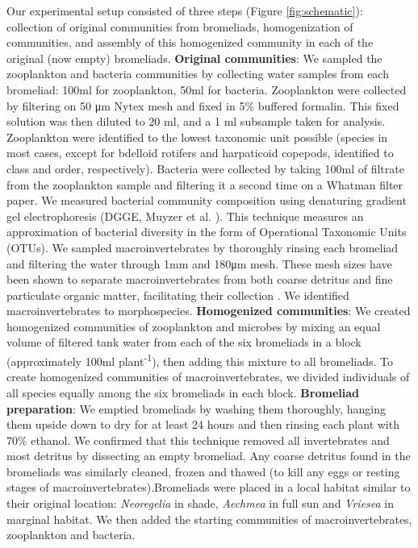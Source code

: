Our experimental setup consisted of three steps (Figure \ref{fig:schematic}): collection
of original communities from bromeliads, homogenization of communities,
and assembly of this homogenized community in each of the original (now
empty) bromeliads. \textbf{Original communities}: We sampled the
zooplankton and bacteria communities by collecting water samples from
each bromeliad: 100ml for zooplankton, 50ml for bacteria. Zooplankton
were collected by filtering on 50 μm Nytex mesh and fixed in 5\%
buffered formalin. This fixed solution was then diluted to 20 ml, and a
1 ml subsample taken for analysis. Zooplankton were identified to the
lowest taxonomic unit possible (species in most cases, except for
bdelloid rotifers and harpaticoid copepods, identified to class and
order, respectively). Bacteria were collected by taking 100ml of
filtrate from the zooplankton sample and filtering it a second time on a
Whatman filter paper. We measured bacterial community composition using
denaturing gradient gel electrophoresis (DGGE, Muyzer et al.
\citeyearpar{Muyzer1993}). This technique measures an approximation of
bacterial diversity in the form of Operational Taxonomic Units (OTUs).
We sampled macroinvertebrates by thoroughly rinsing each bromeliad and
filtering the water through 1mm and 180μm mesh. These mesh sizes have
been shown to separate macroinvertebrates from both coarse detritus and
fine particulate organic matter, facilitating their collection
\citep{Romero2010}. We identified macroinvertebrates to morphospecies.
\textbf{Homogenized communities}: We created homogenized communities of
zooplankton and microbes by mixing an equal volume of filtered tank
water from each of the six bromeliads in a block (approximately 100ml
plant\textsuperscript{-1}), then adding this mixture to all bromeliads.
To create homogenized communities of macroinvertebrates, we divided
individuals of all species equally among the six bromeliads in each
block. \textbf{Bromeliad preparation}: We emptied bromeliads by washing
them thoroughly, hanging them upside down to dry for at least 24 hours
and then rinsing each plant with 70\% ethanol. We confirmed that this
technique removed all invertebrates and most detritus by dissecting an
empty bromeliad. Any coarse detritus found in the bromeliads was
similarly cleaned, frozen and thawed (to kill any eggs or resting stages
of macroinvertebrates).Bromeliads were placed in a local habitat similar
to their original location: \emph{Neoregelia} in shade, \emph{Aechmea}
in full sun and \emph{Vriesea} in marginal habitat. We then added the
starting communities of macroinvertebrates, zooplankton and bacteria.

